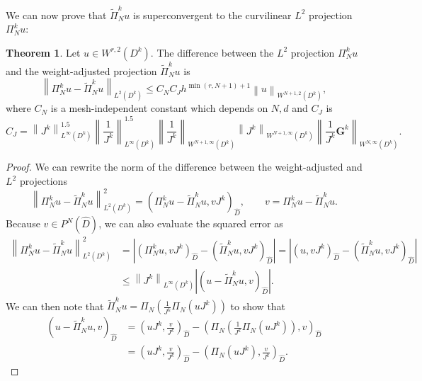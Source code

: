 \documentclass[10pt]{amsart}
\theoremstyle{definition}
\theoremstyle{lemma}
\theoremstyle{theorem}
\newtheorem{theorem}{Theorem}
\theoremstyle{assumption}
\renewcommand{\hat}{\widehat}
\renewcommand{\tilde}{\widetilde}
\newcommand{\nor}[1]{\left\| #1 \right\|}
\newcommand{\LRp}[1]{\left( #1 \right)}
\newcommand{\LRb}[1]{\left| #1 \right|}
\begin{document}
{We can now prove that $\tilde{\Pi}^k_N u$ is superconvergent to the curvilinear $L^2$ projection $\Pi_N^k u$: 
\begin{theorem}
Let $u \in W^{r,2}\LRp{D^k}$.  The difference between the $L^2$ projection $\Pi^k_Nu$ and the weight-adjusted projection $\tilde{\Pi}^k_N u$ is
\[
\nor{\Pi_N^k u - \tilde{\Pi}^k_N  u}_{L^2\LRp{D^k}} \leq C_N C_J h^{\min\LRp{r,N+1}+1}\nor{u}_{W^{N+1,2}\LRp{D^k}},
\]
where $C_N$ is a mesh-independent constant which depends on $N, d$ and $C_J$ is
\[
  C_J = \nor{J^k}_{L^{\infty}\LRp{D^k}}^{1.5}  \nor{\frac{1}{J^k}}_{L^{\infty}\LRp{D^k}}^{1.5} \nor{\frac{1}{J^k}}_{W^{N+1,\infty}\LRp{D^k}}\nor{J^k}_{W^{N+1,\infty}\LRp{D^k}}\nor{\frac{1}{J^k}\bm{G}^k}_{W^{N,\infty}\LRp{D^k}}.
\]
\label{thm:superconverge}
\end{theorem}
\begin{proof}
We can rewrite the norm of the difference between the weight-adjusted and $L^2$ projections
\[
\nor{\Pi_N^k  u - \tilde{\Pi}^k_N  u}_{L^2\LRp{D^k}}^2 = \LRp{\Pi_N^k  u - \tilde{\Pi}^k_N  u,vJ^k}_{\hat{D}}, \qquad v = \Pi_N^k  u - \tilde{\Pi}^k_N  u.
\]
Because $v \in P^N\LRp{\hat{D}}$, we can also evaluate the squared error as
\begin{align*}
\nor{\Pi_N^k  u - \tilde{\Pi}^k_N  u}_{L^2\LRp{D^k}}^2 &= \LRb{\LRp{\Pi_N^k u,vJ^k}_{\hat{D}} - \LRp{\tilde{\Pi}^k_N  u,vJ^k}_{\hat{D}}} = \LRb{\LRp{u,vJ^k}_{\hat{D}} - \LRp{\tilde{\Pi}^k_N  u,vJ^k}_{\hat{D}}} \\
&\leq \nor{J^k}_{L^{\infty}\LRp{D^k}} \LRb{\LRp{u-\tilde{\Pi}^k_Nu,v}_{\hat{D}}}.%
\end{align*}
We can then note that $\tilde{\Pi}^k_Nu = \Pi_N\LRp{\frac{1}{J^k} \Pi_N\LRp{uJ^k}}$ to show that
\begin{align*}
{\LRp{u-\tilde{\Pi}^k_Nu,v}_{\hat{D}}} &= {\LRp{uJ^k,\frac{v}{J^k}}_{\hat{D}}-\LRp{\Pi_N\LRp{\frac{1}{J^k} \Pi_N\LRp{uJ^k}},v}_{\hat{D}}} \\
&= \LRp{uJ^k,\frac{v}{J^k}}_{\hat{D}}-\LRp{\Pi_N\LRp{uJ^k},\frac{v}{J^k}}_{\hat{D}}. %

\end{align*}
\end{proof}}
\end{document}
